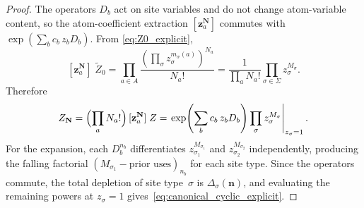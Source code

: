 \documentclass[10pt,a4paper]{amsart}
\newcommand{\GFensemble}{Z}
\begin{document}
\begin{proof}
The operators $D_b$ act on site variables and do not change atom-variable content,
so the atom-coefficient extraction $[\mathbf{z}_a^{\mathbf{N}}]$ commutes with $\exp(\sum_b c_b\,z_b D_b)$.
From \eqref{eq:Z0_explicit},
\[
[\mathbf{z}_a^{\mathbf{N}}]\;\widetilde{\GFensemble}_0
= \prod_{a\in A}\frac{(\prod_\sigma z_\sigma^{m_\sigma(a)})^{N_a}}{N_a!}
= \frac{1}{\prod_a N_a!}\prod_{\sigma\in\Sigma} z_\sigma^{M_\sigma}.
\]
Therefore
\[
\GFensemble_{\mathbf{N}}
= \Bigl(\prod_a N_a!\Bigr)\,[\mathbf{z}_a^{\mathbf{N}}]\;\GFensemble
= \left.\exp\!\left(\sum_b c_b\,z_b D_b\right)\prod_\sigma z_\sigma^{M_\sigma}\right|_{z_\sigma=1}.
\]
For the expansion, each $D_b^{n_b}$ differentiates $z_{\sigma_1}^{M_{\sigma_1}}$ and $z_{\sigma_2}^{M_{\sigma_2}}$ independently,
producing the falling factorial $(M_{\sigma_1} - \text{prior uses})_{n_b}$ for each site type.
Since the operators commute, the total depletion of site type~$\sigma$ is $\Delta_\sigma(\mathbf{n})$,
and evaluating the remaining powers at $z_\sigma=1$ gives~\eqref{eq:canonical_cyclic_explicit}.
\end{proof}
\end{document}
